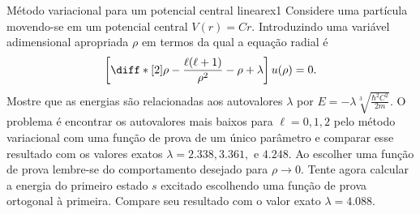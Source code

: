 \begin{exercício}{Método variacional para um potencial central linear}{ex1}
   Considere uma partícula movendo-se em um potencial central \(V(r) = Cr\). Introduzindo uma variável adimensional apropriada \(\rho\) em termos da qual a equação radial é
   \begin{equation*}
      \left[\diff*[2]{}{\rho} - \frac{\ell(\ell+1)}{\rho^2} - \rho + \lambda\right]u(\rho) = 0.
   \end{equation*}
   Mostre que as energias são relacionadas aos autovalores \(\lambda\) por \(E = -\lambda\sqrt[3]{\frac{\hbar^2 C^2}{2m}}.\) O problema é encontrar os autovalores mais baixos para \(\ell = 0, 1, 2\) pelo método variacional com uma função de prova de um único parâmetro e comparar esse resultado com os valores exatos \(\lambda = 2.338, 3.361,\) e \(4.248.\) Ao escolher uma função de prova lembre-se do comportamento desejado para \(\rho \to 0\). Tente agora calcular a energia do primeiro estado \(s\) excitado escolhendo uma função de prova ortogonal à primeira. Compare seu resultado com o valor exato \(\lambda = 4.088.\)
\end{exercício}
